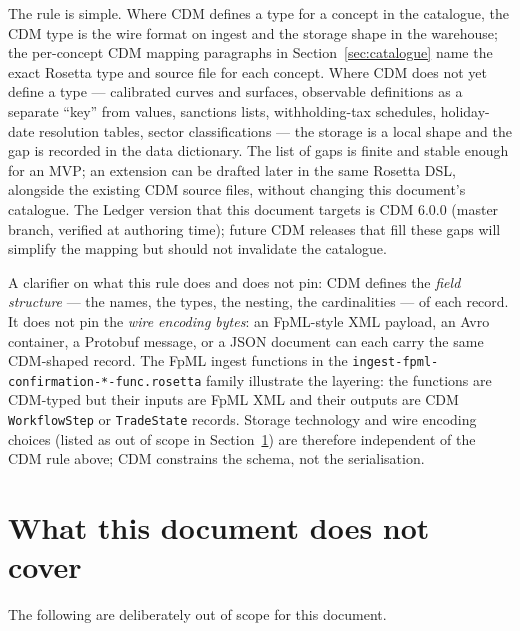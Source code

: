 \documentclass[11pt,a4paper]{article}
\begin{document}
The rule is simple. Where CDM defines a type for a concept in the catalogue, the CDM type is the wire format on ingest and the storage shape in the warehouse; the per-concept CDM mapping paragraphs in Section~\ref{sec:catalogue} name the exact Rosetta type and source file for each concept. Where CDM does not yet define a type --- calibrated curves and surfaces, observable definitions as a separate ``key'' from values, sanctions lists, withholding-tax schedules, holiday-date resolution tables, sector classifications --- the storage is a local shape and the gap is recorded in the data dictionary. The list of gaps is finite and stable enough for an MVP; an extension can be drafted later in the same Rosetta DSL, alongside the existing CDM source files, without changing this document's catalogue. The Ledger version that this document targets is CDM 6.0.0 (master branch, verified at authoring time); future CDM releases that fill these gaps will simplify the mapping but should not invalidate the catalogue.

A clarifier on what this rule does and does not pin: CDM defines the \emph{field structure} --- the names, the types, the nesting, the cardinalities --- of each record. It does not pin the \emph{wire encoding bytes}: an FpML-style XML payload, an Avro container, a Protobuf message, or a JSON document can each carry the same CDM-shaped record. The FpML ingest functions in the \texttt{ingest-fpml-confirmation-*-func.rosetta} family illustrate the layering: the functions are CDM-typed but their inputs are FpML XML and their outputs are CDM \texttt{WorkflowStep} or \texttt{TradeState} records. Storage technology and wire encoding choices (listed as out of scope in Section~\ref{sec:scope}) are therefore independent of the CDM rule above; CDM constrains the schema, not the serialisation.

\section{What this document does not cover}\label{sec:scope}

The following are deliberately out of scope for this document.
\end{document}
